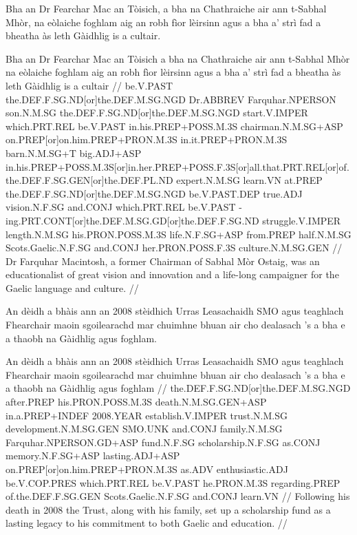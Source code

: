 \documentclass[a4paper,10pt]{article}
\begin{document}
\ex
\begingl
\glpre Bha an Dr Fearchar Mac an Tòisich, a bha na Chathraiche air ann t-Sabhal Mhòr, na eòlaiche foghlam aig an robh fìor lèirsinn agus a bha a' strì fad a bheatha às leth Gàidhlig is a cultair. 

\vspace{4mm}
\gla Bha an Dr Fearchar Mac an Tòisich a bha na Chathraiche air ann t-Sabhal Mhòr na eòlaiche foghlam aig an robh fìor lèirsinn agus a bha a' strì fad a bheatha às leth Gàidhlig is a cultair  //
\glb be.V.PAST the.DEF.F.SG.ND[or]the.DEF.M.SG.NGD Dr.ABBREV Farquhar.NPERSON son.N.M.SG the.DEF.F.SG.ND[or]the.DEF.M.SG.NGD start.V.IMPER which.PRT.REL be.V.PAST in.his.PREP+POSS.M.3S chairman.N.M.SG+ASP on.PREP[or]on.him.PREP+PRON.M.3S in.it.PREP+PRON.M.3S barn.N.M.SG+T big.ADJ+ASP in.his.PREP+POSS.M.3S[or]in.her.PREP+POSS.F.3S[or]all.that.PRT.REL[or]of.the.DEF.F.SG.GEN[or]the.DEF.PL.ND expert.N.M.SG learn.VN at.PREP the.DEF.F.SG.ND[or]the.DEF.M.SG.NGD be.V.PAST.DEP true.ADJ vision.N.F.SG and.CONJ which.PRT.REL be.V.PAST -ing.PRT.CONT[or]the.DEF.M.SG.GD[or]the.DEF.F.SG.ND struggle.V.IMPER length.N.M.SG his.PRON.POSS.M.3S life.N.F.SG+ASP from.PREP half.N.M.SG Scots.Gaelic.N.F.SG and.CONJ her.PRON.POSS.F.3S culture.N.M.SG.GEN  //
\glft Dr Farquhar Macintosh, a former Chairman of Sabhal Mòr Ostaig, was an educationalist of great vision and innovation and a life-long campaigner for the Gaelic language and culture. //
\endgl
\xe

\ex
\begingl
\glpre An dèidh a bhàis ann an 2008 stèidhich Urras Leasachaidh SMO agus teaghlach Fhearchair maoin sgoilearachd mar chuimhne bhuan air cho dealasach 's a bha e a thaobh na Gàidhlig agus foghlam. 

\vspace{4mm}
\gla An dèidh a bhàis {ann an} 2008 stèidhich Urras Leasachaidh SMO agus teaghlach Fhearchair maoin sgoilearachd mar chuimhne bhuan air cho dealasach 's a bha e {a thaobh} na Gàidhlig agus foghlam  //
\glb the.DEF.F.SG.ND[or]the.DEF.M.SG.NGD after.PREP his.PRON.POSS.M.3S death.N.M.SG.GEN+ASP in.a.PREP+INDEF 2008.YEAR establish.V.IMPER trust.N.M.SG development.N.M.SG.GEN SMO.UNK and.CONJ family.N.M.SG Farquhar.NPERSON.GD+ASP fund.N.F.SG scholarship.N.F.SG as.CONJ memory.N.F.SG+ASP lasting.ADJ+ASP on.PREP[or]on.him.PREP+PRON.M.3S as.ADV enthusiastic.ADJ be.V.COP.PRES which.PRT.REL be.V.PAST he.PRON.M.3S regarding.PREP of.the.DEF.F.SG.GEN Scots.Gaelic.N.F.SG and.CONJ learn.VN  //
\glft Following his death in 2008 the Trust, along with his family, set up a scholarship fund as a lasting legacy to his commitment to both Gaelic and education. //
\endgl
\xe
\end{document}
